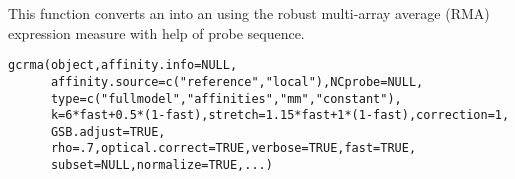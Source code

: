 \begin{Description}\relax
This function converts an  into an 
using the robust multi-array average (RMA) expression measure with help of probe sequence.
\end{Description}
\begin{Usage}
\begin{verbatim}
gcrma(object,affinity.info=NULL,
      affinity.source=c("reference","local"),NCprobe=NULL,
      type=c("fullmodel","affinities","mm","constant"),
      k=6*fast+0.5*(1-fast),stretch=1.15*fast+1*(1-fast),correction=1,
      GSB.adjust=TRUE,
      rho=.7,optical.correct=TRUE,verbose=TRUE,fast=TRUE,
      subset=NULL,normalize=TRUE,...)
\end{verbatim}
\end{Usage}
